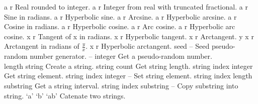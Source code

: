 \begin{longtable}{}
\hline
\optableent
	{a}
	{{\bf {}}}
	{r}
	{Real rounded to integer.}
\hline
\optableent
	{a}
	{{\bf {}}}
	{r}
	{Integer from real with truncated fractional.}
\hline
\optableent
	{a}
	{{\bf {}}}
	{r}
	{Sine in radians.}
\hline
\optableent
	{a}
	{{\bf {}}}
	{r}
	{Hyperbolic sine.}
\hline
\optableent
	{a}
	{{\bf {}}}
	{r}
	{Arcsine.}
\hline
\optableent
	{a}
	{{\bf {}}}
	{r}
	{Hyperbolic arcsine.}
\hline
\optableent
	{a}
	{{\bf {}}}
	{r}
	{Cosine in radians.}
\hline
\optableent
	{a}
	{{\bf {}}}
	{r}
	{Hyperbolic cosine.}
\hline
\optableent
	{a}
	{{\bf {}}}
	{r}
	{Arc cosine.}
\hline
\optableent
	{a}
	{{\bf {}}}
	{r}
	{Hyperbolic arc cosine.}
\hline
\optableent
	{x}
	{{\bf {}}}
	{r}
	{Tangent of x in radians.}
\hline
\optableent
	{x}
	{{\bf {}}}
	{r}
	{Hyperbolic tangent.}
\hline
\optableent
	{x}
	{{\bf {}}}
	{r}
	{Arctangent.}
\hline
\optableent
	{y x}
	{{\bf {}}}
	{r}
	{Arctangent in radians of $\frac{y}{x}$.}
\hline
\optableent
	{x}
	{{\bf {}}}
	{r}
	{Hyperbolic arctangent.}
\hline
\optableent
	{seed}
	{{\bf {}}}
	{--}
	{Seed pseudo-random number generator.}
\hline
\optableent
	{--}
	{{\bf {}}}
	{integer}
	{Get a pseudo-random number.}
\hline \hline
{} \\
\hline \hline
\optableent
	{length}
	{{\bf {}}}
	{string}
	{Create a string.}
\hline
\optableent
	{string}
	{{\bf {}}}
	{count}
	{Get string length.}
\hline
\optableent
	{string index}
	{{\bf {}}}
	{integer}
	{Get string element.}
\hline
\optableent
	{string index integer}
	{{\bf {}}}
	{--}
	{Set string element.}
\hline
\optableent
	{string index length}
	{{\bf {}}}
	{substring}
	{Get a string interval.}
\hline
\optableent
	{string index substring}
	{{\bf {}}}
	{--}
	{Copy substring into string.}
\hline
\optableent
	{`a' `b'}
	{{\bf {}}}
	{`ab'}
	{Catenate two strings.}
\hline
\optableent

\end{longtable}

